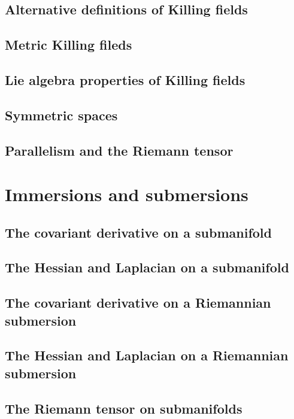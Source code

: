 \documentclass[a4paper]{article}
\begin{document}
\subsection{Alternative definitions of Killing fields}

\subsection{Metric Killing fileds}

\subsection{Lie algebra properties of Killing fields}

\subsection{Symmetric spaces}

\subsection{Parallelism and the Riemann tensor}

\section{Immersions and submersions}

\subsection{The covariant derivative on a submanifold}

\subsection{The Hessian and Laplacian on a submanifold}

\subsection{The covariant derivative on a Riemannian submersion}

\subsection{The Hessian and Laplacian on a Riemannian submersion}

\subsection{The Riemann tensor on submanifolds}
\end{document}
